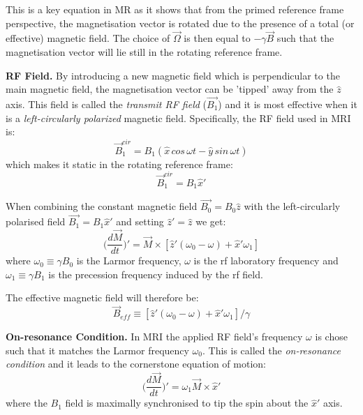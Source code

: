 This is a key equation in MR as it shows that from the primed reference frame perspective, the magnetisation vector is rotated due to the presence of a total (or effective) magnetic field. The choice of $\vec{\Omega}$ is then equal to $- \gamma \vec{B}$ such that the magnetisation vector will lie still in the rotating reference frame.

\hfill

\textbf{RF Field.} By introducing a new magnetic field which is perpendicular to the main magnetic field, the magnetisation vector can be 'tipped' away from the $\hat{z}$ axis. This field is called the \textit{transmit RF field} ($\vec{B_1}$) and it is most effective when it is a \textit{left-circularly polarized} magnetic field. Specifically, the RF field used in MRI is:
\begin{equation}\label{eq:324}
    \vec{B}_{1}^{cir} = B_1 (\hat{x} \, cos \, \omega t - \hat{y} \, sin \, \omega t)
\end{equation}
which makes it static in the rotating reference frame:
\begin{equation}\label{eq:325}
    \vec{B}_{1}^{cir} = B_1 \hat{x}'
\end{equation}

When combining the constant magnetic field $\vec{B_0} = B_0 \hat{z}$ with the left-circularly polarised field $\vec{B_1} = B_1 \hat{x}'$ and setting $\hat{z}' = \hat{z}$ we get:
\begin{equation}\label{eq:326}
    \Bigg( \frac{d \vec{M} }{dt} \Bigg)' = \vec{M} \times [ \hat{z}'  (\omega_0 - \omega) + \hat{x}' \omega_1]
\end{equation}
where $\omega_0 \equiv \gamma B_0$ is the Larmor frequency, $\omega$ is the rf laboratory frequency and $\omega_1 \equiv \gamma B_1$ is the precession frequency induced by the rf field.

The effective magnetic field will therefore be:
\begin{equation}\label{eq:328}
    \vec{B}_{eff} \equiv [ \hat{z}'  (\omega_0 - \omega) + \hat{x}' \omega_1] / \gamma
\end{equation}

\hfill

\textbf{On-resonance Condition.} 
In MRI the applied RF field's frequency $\omega$ is chose such that it matches the Larmor frequency $\omega_0$. This is called the \textit{on-resonance condition} and it leads to the cornerstone equation of motion:
\begin{equation}\label{eq:329}
    \Bigg( \frac{d \vec{M}}{dt} \Bigg)' = \omega_1 \vec{M} \times \hat{x}'
\end{equation}
where the $B_1$ field is maximally synchronised to tip the spin about the $\hat{x}'$ axis.

